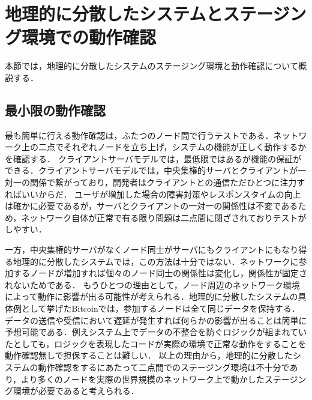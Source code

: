 \section{地理的に分散したシステムとステージング環境での動作確認}
\label{background:staging-environment}
本節では，地理的に分散したシステムのステージング環境と動作確認について概説する．

\subsection{最小限の動作確認}
最も簡単に行える動作確認は，ふたつのノード間で行うテストである．ネットワーク上の二点でそれぞれノードを立ち上げ，システムの機能が正しく動作するかを確認する．
クライアントサーバモデルでは，最低限ではあるが機能の保証ができる．クライアントサーバモデルでは，中央集権的サーバとクライアントが一対一の関係で繋がっており，開発者はクライアントとの通信ただひとつに注力すればいいからだ．
ユーザが増加した場合の障害対策やレスポンスタイムの向上は確かに必要であるが，サーバとクライアントの一対一の関係性は不変であるため，ネットワーク自体が正常で有る限り問題は二点間に閉ざされておりテストがしやすい．

一方，中央集権的サーバがなくノード同士がサーバにもクライアントにもなり得る地理的に分散したシステムでは，この方法は十分ではない．ネットワークに参加するノードが増加すれば個々のノード同士の関係性は変化し，関係性が固定されないためである．
もうひとつの理由として，ノード周辺のネットワーク環境によって動作に影響が出る可能性が考えられる．地理的に分散したシステムの具体例として挙げたBitcoinでは，参加するノードは全て同じデータを保持する．
データの送信や受信において遅延が発生すれば何らかの影響が出ることは簡単に予想可能である．例えシステム上でデータの不整合を防ぐロジックが組まれていたとしても，ロジックを表現したコードが実際の環境で正常な動作をすることを動作確認無しで担保することは難しい．
以上の理由から，地理的に分散したシステムの動作確認をするにあたって二点間でのステージング環境は不十分であり，より多くのノードを実際の世界規模のネットワーク上で動かしたステージング環境が必要であると考えられる．

